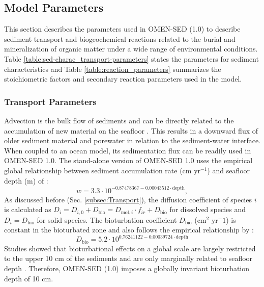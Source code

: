 \documentclass[gmd, manuscript]{copernicus}
\begin{document}
\subsection{Model Parameters}
This section describes the parameters used in OMEN-SED (1.0) to describe sediment transport and biogeochemical reactions related to the burial and mineralization of organic matter under a wide range of environmental conditions. 
Table \ref{table:sed-charac_transport-parameters} states the parameters for sediment characteristics and Table \ref{table:reaction_parameters} summarizes the stoichiometric factors and 
secondary reaction parameters used in the model.

\subsubsection{Transport Parameters}
Advection is the bulk flow of sediments and can be directly related to the accumulation of new material on the seafloor \citep[i.e. sedimentation,][]{burdige2006geochemistry}. 
This results in a downward flux of older sediment material and porewater in relation to the sediment-water interface. When coupled to an ocean model, its sedimentation flux can be readily used in OMEN-SED 1.0. 
The stand-alone version of OMEN-SED 1.0 uses the empirical global relationship between 
sediment accumulation rate (cm yr$^{-1}$) and seafloor depth (m) of \citet{middelburg_empirical_1997}: 
\begin{equation}
 w = 3.3\cdot 10^{-0.87478367-0.00043512\cdot \text{depth}}\label{eq:sedimentation_rate},
\end{equation}
As discussed before (Sec. \ref{subsec:Transport}), the diffusion coefficient of species $i$ is calculated as $D_i=D_{i,0}+D_{\mathrm{bio}}=D_{\mathrm{mol},i}\cdot f_{ir}+D_{\mathrm{bio}}$ for dissolved species and $D_i=D_{\mathrm{bio}}$ for solid species. 
The bioturbation coefficient $D_{\mathrm{bio}}$ (cm$^2$ yr$^-1$) is constant in the bioturbated zone and also follows the empirical relationship by \citet{middelburg_empirical_1997}:
\begin{equation}
 D_{\mathrm{bio}} = 5.2\cdot 10^{0.76241122-0.00039724\cdot \text{depth}}\label{eq:bioturbation_coeff}
\end{equation}
Studies showed that bioturbational effects on a global scale are largely restricted to the upper 10 cm of the sediments and are only marginally related to seafloor depth \citep[e.g.][]{boudreau_mean_1998, teal_global_2010}. 
Therefore, OMEN-SED (1.0) imposes a globally invariant bioturbation depth of 10 cm. 
\end{document}
